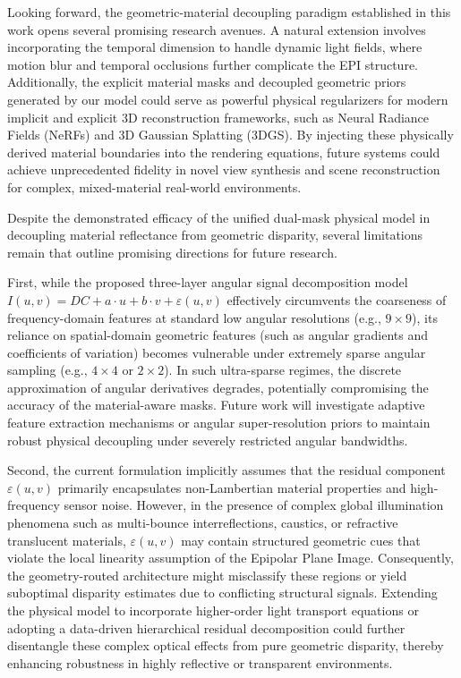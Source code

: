 Looking forward, the geometric-material decoupling paradigm established in this work opens several promising research avenues. A natural extension involves incorporating the temporal dimension to handle dynamic light fields, where motion blur and temporal occlusions further complicate the EPI structure. Additionally, the explicit material masks and decoupled geometric priors generated by our model could serve as powerful physical regularizers for modern implicit and explicit 3D reconstruction frameworks, such as Neural Radiance Fields (NeRFs) and 3D Gaussian Splatting (3DGS). By injecting these physically derived material boundaries into the rendering equations, future systems could achieve unprecedented fidelity in novel view synthesis and scene reconstruction for complex, mixed-material real-world environments.

Despite the demonstrated efficacy of the unified dual-mask physical model in decoupling material reflectance from geometric disparity, several limitations remain that outline promising directions for future research. 

First, while the proposed three-layer angular signal decomposition model $I(u,v) = DC + a\cdot u + b\cdot v + \varepsilon(u,v)$ effectively circumvents the coarseness of frequency-domain features at standard low angular resolutions (e.g., $9 \times 9$), its reliance on spatial-domain geometric features (such as angular gradients and coefficients of variation) becomes vulnerable under extremely sparse angular sampling (e.g., $4 \times 4$ or $2 \times 2$). In such ultra-sparse regimes, the discrete approximation of angular derivatives degrades, potentially compromising the accuracy of the material-aware masks. Future work will investigate adaptive feature extraction mechanisms or angular super-resolution priors to maintain robust physical decoupling under severely restricted angular bandwidths.

Second, the current formulation implicitly assumes that the residual component $\varepsilon(u,v)$ primarily encapsulates non-Lambertian material properties and high-frequency sensor noise. However, in the presence of complex global illumination phenomena such as multi-bounce interreflections, caustics, or refractive translucent materials, $\varepsilon(u,v)$ may contain structured geometric cues that violate the local linearity assumption of the Epipolar Plane Image. Consequently, the geometry-routed architecture might misclassify these regions or yield suboptimal disparity estimates due to conflicting structural signals. Extending the physical model to incorporate higher-order light transport equations or adopting a data-driven hierarchical residual decomposition could further disentangle these complex optical effects from pure geometric disparity, thereby enhancing robustness in highly reflective or transparent environments.

